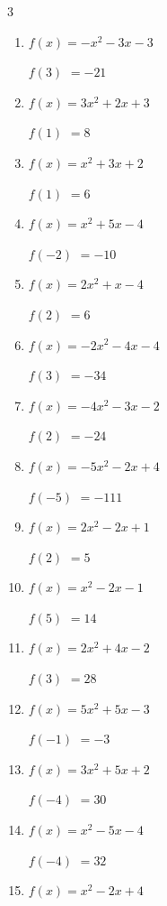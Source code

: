 \begin{multicols}{3}
\begin{enumerate}
$f(5)$
        $= 143$

\columnbreak %

\resetques

  \item $f(x)=-x^{2}-3x-3$

$f(3)$
        $= -21$

  \item $f(x)=3x^{2}+2x+3$

$f(1)$
        $= 8$

  \item $f(x)=x^{2}+3x+2$

$f(1)$
        $= 6$

  \item $f(x)=x^{2}+5x-4$

$f(-2)$
        $= -10$

  \item $f(x)=2x^{2}+x-4$

$f(2)$
        $= 6$

  \item $f(x)=-2x^{2}-4x-4$

$f(3)$
        $= -34$

  \item $f(x)=-4x^{2}-3x-2$

$f(2)$
        $= -24$

  \item $f(x)=-5x^{2}-2x+4$

$f(-5)$
        $= -111$

  \item $f(x)=2x^{2}-2x+1$

$f(2)$
        $= 5$

  \item $f(x)=x^{2}-2x-1$

$f(5)$
        $= 14$

  \item $f(x)=2x^{2}+4x-2$

$f(3)$
        $= 28$

  \item $f(x)=5x^{2}+5x-3$

$f(-1)$
        $= -3$

  \item $f(x)=3x^{2}+5x+2$

$f(-4)$
        $= 30$

  \item $f(x)=x^{2}-5x-4$

$f(-4)$
        $= 32$

  \item $f(x)=x^{2}-2x+4$


\end{enumerate}
\end{multicols}
